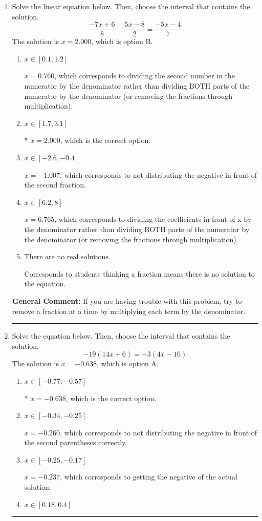 \documentclass{extbook}[14pt]
\newcommand{\litem}[1]{\item #1

\rule{\textwidth}{0.4pt}}
\begin{document}
\begin{enumerate}\litem{
Solve the linear equation below. Then, choose the interval that contains the solution.
\[ \frac{-7x + 6}{8} - \frac{5x -8}{2} = \frac{-5x -4}{7} \]The solution is \( x = 2.000 \), which is option B.\begin{enumerate}[label=\Alph*.]
\item \( x \in [0.1, 1.2] \)

 $x = 0.760$, which corresponds to dividing the second number in the numerator by the denominator rather than dividing BOTH parts of the numerator by the denominator (or removing the fractions through multiplication).
\item \( x \in [1.7, 3.1] \)

* $x = 2.000$, which is the correct option.
\item \( x \in [-2.6, -0.4] \)

 $x = -1.007$, which corresponds to not distributing the negative in front of the second fraction.
\item \( x \in [6.2, 8] \)

 $x = 6.765$, which corresponds to dividing the coefficients in front of x by the denominator rather than dividing BOTH parts of the numerator by the denominator (or removing the fractions through multiplication).
\item \( \text{There are no real solutions.} \)

Corresponds to students thinking a fraction means there is no solution to the equation.
\end{enumerate}

\textbf{General Comment:} If you are having trouble with this problem, try to remove a fraction at a time by multiplying each term by the denominator.
}
\litem{
Solve the equation below. Then, choose the interval that contains the solution.
\[ -19(14x + 6) = -3(4x -16) \]The solution is \( x = -0.638 \), which is option A.\begin{enumerate}[label=\Alph*.]
\item \( x \in [-0.77, -0.57] \)

* $x = -0.638$, which is the correct option.
\item \( x \in [-0.34, -0.25] \)

$x = -0.260$, which corresponds to not distributing the negative in front of the second parentheses correctly.
\item \( x \in [-0.25, -0.17] \)

$x = -0.237$, which corresponds to getting the negative of the actual solution.
\item \( x \in [0.18, 0.4] \)


\end{enumerate}}
\end{enumerate}
\end{document}
